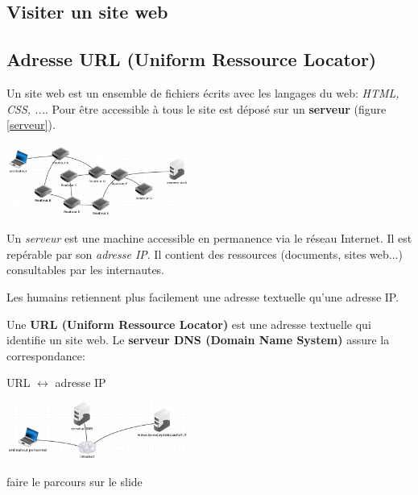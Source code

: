 \documentclass[a4paper,11pt]{article}
\begin{document}
\begin{Form}
\section{Visiter un site web}
\subsection{Adresse URL (Uniform Ressource Locator)}
Un site web est un ensemble de fichiers écrits avec les langages du web: \emph{HTML, CSS, ...}. Pour être accessible à tous le site est déposé sur un \textbf{serveur} (figure \ref{serveur}).
\begin{center}
\centering
\includegraphics[width=6cm]{ressources/serveur-web.png}
\label{serveur}
\begin{aretenir}[]
Un \emph{serveur} est une machine accessible en permanence via le réseau Internet. Il est repérable par son \emph{adresse IP}. Il contient des ressources (documents, sites web...) consultables par les internautes.
\end{aretenir}
\end{center}
Les humains retiennent plus facilement une adresse textuelle qu'une adresse IP. 
\begin{aretenir}[]
Une \textbf{URL (Uniform Ressource Locator)} est une adresse textuelle qui identifie un site web. Le \textbf{serveur DNS (Domain Name System)} assure la correspondance: 
\begin{center}
URL $\leftrightarrow$ adresse IP
\end{center}
\end{aretenir}
\begin{center}
\centering
\includegraphics[width=6cm]{ressources/serveur-dns.png}
\label{dns}
\end{center}
\begin{commentprof}
faire le parcours sur le slide
\end{commentprof}

\end{Form}
\end{document}
